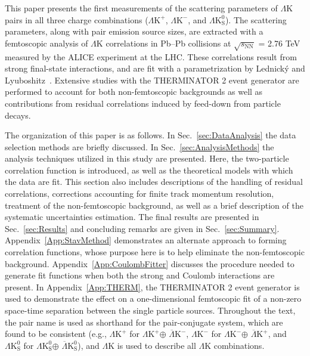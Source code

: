 \documentclass[ALICE,manyauthors]{cernphprep}
\newcommand{\LamK}{$\Lambda$K\xspace}
\newcommand{\LamKchP}{$\Lambda\mathrm{K^{+}}$\xspace}
\newcommand{\ALamKchM}{$\overline{\Lambda}\mathrm{K^{-}}$\xspace}
\newcommand{\LamKchM}{$\Lambda\mathrm{K^{-}}$\xspace}
\newcommand{\ALamKchP}{$\overline{\Lambda}\mathrm{K^{+}}$\xspace}
\newcommand{\LamKs}{$\Lambda\mathrm{K^{0}_{S}}$\xspace}
\newcommand{\ALamKs}{$\overline{\Lambda}\mathrm{K^{0}_{S}}$\xspace}
\begin{document}
This paper presents the first measurements of the scattering parameters of \LamK pairs in all three charge combinations (\LamKchP, \LamKchM, and \LamKs).
The scattering parameters, along with pair emission source sizes, are extracted with a femtoscopic analysis of \LamK correlations in Pb--Pb collisions at $\sqrt{s_{\mathrm{NN}}}$ = 2.76 TeV measured by the ALICE experiment at the LHC.  
These correlations result from strong final-state interactions, and are fit with a parametrization by Lednick\'y and Lyuboshitz~\cite{Lednicky:82}.  
Extensive studies with the THERMINATOR 2 event generator are performed to account for both non-femtoscopic backgrounds as well as contributions from residual correlations induced by feed-down from particle decays.

The organization of this paper is as follows.  
In Sec.~\ref{sec:DataAnalysis} the data selection methods are briefly discussed.
In Sec.~\ref{sec:AnalysisMethods} the analysis techniques utilized in this study are presented.  
Here, the two-particle correlation function is introduced, as well as the theoretical models with which the data are fit.  
This section also includes descriptions of the handling of residual correlations, corrections accounting for finite track momentum resolution, treatment of the non-femtoscopic background, as well as a brief description of the systematic uncertainties estimation.  
The final results are presented in Sec.~\ref{sec:Results} and concluding remarks are given in Sec.~\ref{sec:Summary}.
Appendix~\ref{App:StavMethod} demonstrates an alternate approach to forming correlation functions, whose purpose here is to help eliminate the non-femtoscopic background.
Appendix~\ref{App:CoulombFitter} discusses the procedure needed to generate fit functions when both the strong and Coulomb interactions are present.
In Appendix~\ref{App:THERM}, the THERMINATOR 2 event generator is used to demonstrate the effect on a one-dimensional femtoscopic fit of a non-zero space-time separation between the single particle sources.
Throughout the text, the pair name is used as shorthand for the pair-conjugate system, which are found to be consistent (e.g., \LamKchP for \LamKchP $\oplus$ \ALamKchM, \LamKchM for \LamKchM $\oplus$ \ALamKchP, and \LamKs for \LamKs $\oplus$ \ALamKs), and \LamK is used to describe all \LamK combinations.

\end{document}
